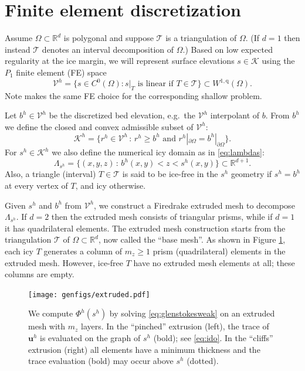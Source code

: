 \documentclass[letterpaper,final,12pt,reqno]{amsart}
\theoremstyle{claim}
\newcommand{\RR}{\mathbb{R}}
\newcommand{\bu}{\mathbf{u}}
\newcommand{\qq}{{\text{q}}}
\numberwithin{equation}{section}
\numberwithin{figure}{section}
\numberwithin{table}{section}
\numberwithin{theorem}{section}
\begin{document}
\section{Finite element discretization} \label{sec:fe}

Assume $\Omega \subset \RR^d$ is polygonal and suppose $\mathcal{T}$ is a triangulation of $\Omega$.  (If $d=1$ then instead $\mathcal{T}$ denotes an interval decomposition of $\Omega$.)  Based on low expected regularity at the ice margin, we will represent surface elevations $s\in \mathcal{K}$ using the $P_1$ finite element (FE) space
\begin{equation}
\mathcal{V}^h = \{s \in C^0(\Omega) : s|_T \text{ is linear if } T \in \mathcal{T}\} \subset W^{1,\qq}(\Omega).
\end{equation}
Note \cite{JouvetBueler2012} makes the same FE choice for the corresponding shallow problem.

Let $b^h \in \mathcal{V}^h$ be the discretized bed elevation, e.g.~the $\mathcal{V}^h$ interpolant of $b$.  From $b^h$ we define the closed and convex admissible subset of $\mathcal{V}^h$:
\begin{equation}
\mathcal{K}^h = \{r^h \in \mathcal{V}^h \,:\, r^h \ge b^h \text{ and } r^h|_{\partial\Omega} = b^h|_{\partial\Omega}\}.  \label{eq:feK}
\end{equation}
For $s^h\in \mathcal{K}^h$ we also define the numerical icy domain as in \eqref{eq:lambdas}:
\begin{equation}
\Lambda_{s^h} = \{(x,y,z)\,:\,b^h(x,y) < z < s^h(x,y)\} \subset \RR^{d+1}.  \label{eq:felambdas}
\end{equation}
Also, a triangle (interval) $T\in\mathcal{T}$ is said to be ice-free in the $s^h$ geometry if $s^h=b^h$ at every vertex of $T$, and icy otherwise.

Given $s^h$ and $b^h$ from $\mathcal{V}^h$, we construct a Firedrake extruded mesh \cite{McRaeetal2016} to decompose $\Lambda_{s^h}$.  If $d=2$ then the extruded mesh consists of triangular prisms, while if $d=1$ it has quadrilateral elements.  The extruded mesh construction starts from the triangulation $\mathcal{T}$ of $\Omega \subset \RR^d$, now called the ``base mesh''.  As shown in Figure \ref{fig:extruded}, each icy $T$ generates a column of $m_z \ge 1$ prism (quadrilateral) elements in the extruded mesh.  However, ice-free $T$ have no extruded mesh elements at all; these columns are empty.

\begin{figure}[t]
\begin{center}
\texttt{[image: genfigs/extruded.pdf]}
\end{center}
\caption{We compute $\Phi^h(s^h)$ by solving \eqref{eq:glenstokesweak} on an extruded mesh with $m_z$ layers.  In the ``pinched'' extrusion (left), the trace of $\bu^h$ is evaluated on the graph of $s^h$ (bold); see \eqref{eq:ido}.  In the ``cliffs'' extrusion (right) all elements have a minimum thickness and the trace evaluation (bold) may occur above $s^h$ (dotted).}
\label{fig:extruded}
\end{figure}
\end{document}
